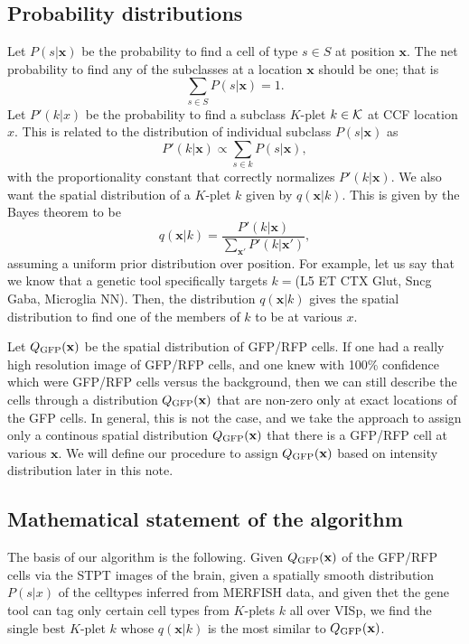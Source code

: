 \documentclass{article}
\newcommand\beq{\begin{equation}}
\newcommand\eeq[1]{\label{#1}\end{equation}}
\begin{document}
\subsection{Probability distributions}

Let $P(s|\mathbf{x})$ be the probability to find a cell of type $s\in S$
at position $\mathbf{x}$. 
The net probability to find any of the subclasses at a location $\mathbf{x}$ should be one; that is
\beq
\sum_{s\in S} P(s|\mathbf{x}) = 1.
\eeq{norms}
Let $P'(k|x)$ be the
probability to find a subclass $K$-plet $k \in {\cal K}$ at CCF location $x$.  This is
related to the distribution of individual subclass $P(s|\mathbf{x})$ as
\beq
P'(k|\mathbf{x}) \propto \sum_{s\in k} P(s|\mathbf{x}),
\eeq{kdist}
with the proportionality constant that correctly normalizes $P'(k|\mathbf{x})$. We also want
the spatial distribution of a $K$-plet $k$ given by $q(\mathbf{x}|k)$. This is given by the Bayes theorem to be 
\beq
q(\mathbf{x}|k) = \frac{P'(k|\mathbf{x})}{\sum_{\mathbf{x}'} P'(k|\mathbf{x}') },
\eeq{bayes}
assuming a uniform prior distribution over position. For example, let us say that we know that a 
genetic tool specifically targets $k=$(L5 ET CTX Glut, Sncg Gaba, Microglia NN).  Then, the 
distribution $q(\mathbf{x}|k)$ gives the spatial distribution to find one of the members of $k$ 
to be at various $x$.

Let $Q_{\rm GFP}(\mathbf{x})$ be the spatial distribution of GFP/RFP cells. If one had a really high resolution
image of GFP/RFP cells, and one knew with 100\% confidence which were GFP/RFP cells versus the background, 
then we can still describe the cells through a distribution $Q_{\rm GFP}(\mathbf{x})$ that are non-zero only 
at exact locations of the GFP cells. In general, this is not the case, and we take the approach to assign 
only a continous spatial distribution $Q_{\rm GFP}(\mathbf{x})$ that there is a GFP/RFP cell at various $\mathbf{x}$.
We will define our procedure to assign $Q_{\rm GFP}(\mathbf{x})$ based on intensity distribution later in this note.

\subsection{Mathematical statement of the algorithm}
The basis of our algorithm is the following.  Given $Q_{\rm GFP}(\mathbf{x})$ of the GFP/RFP cells via the STPT images 
of the brain, given a spatially smooth distribution $P(s|x)$ of the celltypes inferred from MERFISH data, and 
given thet the gene tool can tag only certain cell types from $K$-plets $k$ all over VISp, we find the single best $K$-plet $k$ 
whose $q(\mathbf{x}|k)$ is the most similar to $Q_{\rm GFP}(\mathbf{x})$.
\end{document}
